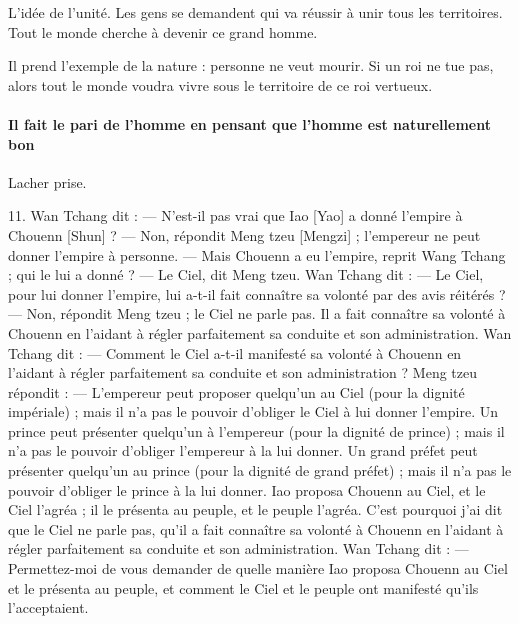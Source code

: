 L'idée de l'unité. Les gens se demandent qui va réussir à unir tous les territoires. Tout le monde cherche à devenir ce grand homme.  

Il prend l'exemple de la nature : personne ne veut mourir. Si un roi ne tue pas, alors tout le monde voudra vivre sous le territoire de ce roi vertueux.

\paragraph{Il fait le pari de l'homme en pensant que l'homme est naturellement bon}

Lacher prise. 

\begin{singlequote}
  11.	Wan Tchang dit :
—	N’est-il pas vrai que Iao [Yao] a donné l’empire à Chouenn [Shun] ?
—	Non, répondit Meng tzeu [Mengzi] ; l’empereur ne peut donner l’empire à personne.
—	Mais Chouenn a eu l’empire, reprit Wang Tchang ; qui le lui a donné ?
—	Le Ciel, dit Meng tzeu. Wan Tchang dit :
—	Le Ciel, pour lui donner l’empire, lui a-t-il fait connaître sa volonté par des avis réitérés ?
—	Non, répondit Meng tzeu ; le Ciel ne parle pas. Il a fait connaître sa volonté à Chouenn en l’aidant à régler parfaitement sa conduite et son administration.
Wan Tchang dit :
—	Comment le Ciel a-t-il manifesté sa volonté à Chouenn en l’aidant à régler parfaitement sa conduite et son administration ?
Meng tzeu répondit :
—	L’empereur peut proposer quelqu’un au Ciel (pour la dignité impériale) ; mais il n’a pas le pouvoir d’obliger le Ciel à lui donner l’empire. Un prince peut présenter quelqu’un à l’empereur (pour la dignité de prince) ; mais il n’a pas le pouvoir d’obliger l’empereur à la lui donner. Un grand préfet peut présenter quelqu’un au prince (pour la dignité de grand préfet) ; mais il n’a pas le pouvoir d’obliger le prince à la lui donner. Iao proposa Chouenn au Ciel, et le Ciel l’agréa ; il le présenta au peuple, et le peuple l’agréa. C’est pourquoi j’ai dit que le Ciel ne parle pas, qu’il a fait connaître sa volonté à Chouenn en l’aidant à régler parfaitement sa conduite et son administration.
Wan Tchang dit :
—	Permettez-moi de vous demander de quelle manière Iao proposa Chouenn au Ciel et le présenta au peuple, et comment le Ciel et le peuple ont manifesté qu’ils l’acceptaient.
 

\end{singlequote}

